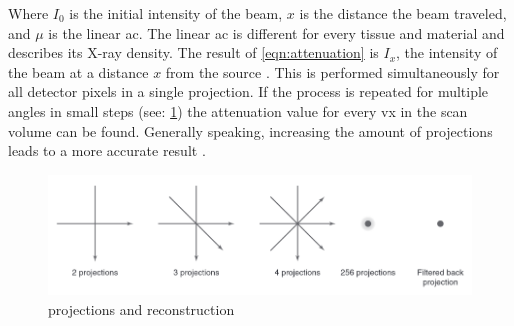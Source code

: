 \noindent
Where $I_{0}$ is the initial intensity of the beam, $x$ is the distance the beam traveled, and $\mu$ is the linear \acrlong{ac}.
The linear \acrfull{ac} is different for every tissue and material and describes its X-ray density.
The result of \cref{eqn:attenuation} is $I_{x}$, the intensity of the beam at a distance $x$ from the source \cite{liMicrocomputedTomographySmall2008,orhanMicrocomputedTomographyMicroCT2020}.
This is performed simultaneously for all detector pixels in a single projection.
If the process is repeated for multiple angles in small steps (see: \cref{fig:ct-projections}) the attenuation value for every \gls{vx} in the scan volume can be found.
Generally speaking, increasing the amount of projections leads to a more accurate result \cite{liMicrocomputedTomographySmall2008,orhanMicrocomputedTomographyMicroCT2020}.
\begin{figure}[h]
	\centerline{
		\includegraphics[scale=0.5]{images/ct-projections.png}}
	\caption{\mct\space projections and reconstruction \cite{orhanMicrocomputedTomographyMicroCT2020}}\label{fig:ct-projections}
\end{figure}


